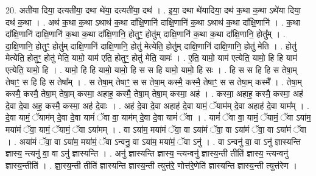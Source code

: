 \documentclass[17pt]{extarticle}
\begin{document}
20. अती॑या दिया॒ दत्यती॑या॒ दथा थे॑या॒ दत्यती॑या॒ दथ॑ । . इ॒या॒ दथा थे॑यादिया॒ दथ॑ क॒था क॒था ऽथे॑या दिया॒ दथ॑ क॒था । . अथ॑ क॒था क॒था ऽथाथ॑ क॒था दा᳚क्षि॒णानि॑ दाक्षि॒णानि॑ क॒था ऽथाथ॑ क॒था दा᳚क्षि॒णानि॑ । . क॒था दा᳚क्षि॒णानि॑ दाक्षि॒णानि॑ क॒था क॒था दा᳚क्षि॒णानि॒ होतुꣳ॒॒ होतु॑म् दाक्षि॒णानि॑ क॒था क॒था दा᳚क्षि॒णानि॒ होतु᳚म् । . दा॒क्षि॒णानि॒ होतुꣳ॒॒ होतु॑म् दाक्षि॒णानि॑ दाक्षि॒णानि॒ होतु॑ मेत्येति॒ होतु॑म् दाक्षि॒णानि॑ दाक्षि॒णानि॒ होतु॑ मेति । . होतु॑ मेत्येति॒ होतुꣳ॒॒ होतु॑ मेति॒ यामो॒ याम॑ एति॒ होतुꣳ॒॒ होतु॑ मेति॒ यामः॑ । . ए॒ति॒ यामो॒ याम॑ एत्येति॒ यामो॒ हि हि याम॑ एत्येति॒ यामो॒ हि । . यामो॒ हि हि यामो॒ यामो॒ हि स स हि यामो॒ यामो॒ हि सः । . हि स स हि हि स तेषा॒म् तेषाꣳ॒॒ स हि हि स तेषा᳚म् । . स तेषा॒म् तेषाꣳ॒॒ स स तेषा॒म् कस्मै॒ कस्मै॒ तेषाꣳ॒॒ स स तेषा॒म् कस्मै᳚ । . तेषा॒म् कस्मै॒ कस्मै॒ तेषा॒म् तेषा॒म् कस्मा॒ अहाह॒ कस्मै॒ तेषा॒म् तेषा॒म् कस्मा॒ अह॑ । . कस्मा॒ अहाह॒ कस्मै॒ कस्मा॒ अह॑ दे॒वा दे॒वा अह॒ कस्मै॒ कस्मा॒ अह॑ दे॒वाः । . अह॑ दे॒वा दे॒वा अहाह॑ दे॒वा यामं॒ ॅयाम॑म् दे॒वा अहाह॑ दे॒वा याम᳚म् । . दे॒वा यामं॒ ॅयाम॑म् दे॒वा दे॒वा यामं॑ ॅवा वा॒ याम॑म् दे॒वा दे॒वा यामं॑ ॅवा । . यामं॑ ॅवा वा॒ यामं॒ ॅयामं॒ ॅवा ऽया॑म॒ मया॑मं ॅवा॒ यामं॒ ॅयामं॒ ॅवा ऽया॑मम् । . वा ऽया॑म॒ मया॑मं ॅवा॒ वा ऽया॑मं ॅवा॒ वा ऽया॑मं ॅवा॒ वा ऽया॑मं ॅवा । . अया॑मं ॅवा॒ वा ऽया॑म॒ मया॑मं॒ ॅवा ऽन्वनु॒ वा ऽया॑म॒ मया॑मं॒ ॅवा ऽनु॑ । . वा ऽन्वनु॑ वा॒ वा ऽनु॑ ज्ञास्यन्ति ज्ञास्य॒ न्त्यनु॑ वा॒ वा ऽनु॑ ज्ञास्यन्ति । . अनु॑ ज्ञास्यन्ति ज्ञास्य॒ न्त्यन्वनु॑ ज्ञास्य॒न्ती तीति॑ ज्ञास्य॒ न्त्यन्वनु॑ ज्ञास्य॒न्तीति॑ । . ज्ञा॒स्य॒न्ती तीति॑ ज्ञास्यन्ति ज्ञास्य॒न्ती त्युत्त॑रे॒ णोत्त॑रे॒णेति॑ ज्ञास्यन्ति ज्ञास्य॒न्ती त्युत्त॑रेण । \newline
\end{document}
